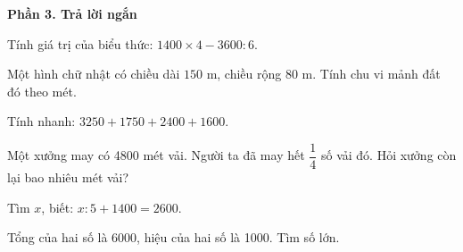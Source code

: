 \textbf{Phần 3. Trả lời ngắn}

\begin{ex} %
Tính giá trị của biểu thức: $1400 \times 4 - 3600 : 6$.
\end{ex}

\begin{ex} %
Một hình chữ nhật có chiều dài $150\text{ m}$, chiều rộng $80\text{ m}$. Tính chu vi mảnh đất đó theo mét.
\end{ex}

\begin{ex} %
Tính nhanh: $3250 + 1750 + 2400 + 1600$.
\end{ex}

\begin{ex} %
Một xưởng may có 4800 mét vải. Người ta đã may hết $\dfrac{1}{4}$ số vải đó. Hỏi xưởng còn lại bao nhiêu mét vải?
\end{ex}

\begin{ex} %
Tìm $x$, biết: $x : 5 + 1400 = 2600$.
\end{ex}

\begin{ex} %
Tổng của hai số là 6000, hiệu của hai số là 1000. Tìm số lớn.
\end{ex}
